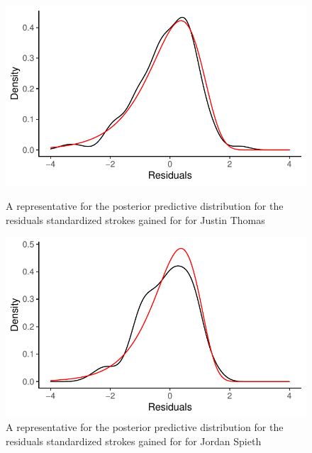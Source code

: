 \documentclass{article}\usepackage[]{graphicx}\usepackage[]{color}
\begin{document}
\begin{figure}[h]
\begin{minipage}{0.475\textwidth}
    \centering
    \includegraphics[width=1\textwidth]{Figures/posterior_predictive_thomas.pdf}
    \caption{A representative for the posterior predictive distribution for the residuals standardized strokes gained for for Justin Thomas}
    \label{fig:thomas_posterior_predictive}
\end{minipage}
\hspace{0.05\textwidth}
\begin{minipage}{0.475\textwidth}
    \centering
    \includegraphics[width=1\textwidth]{Figures/posterior_predictive_spieth.pdf}
    \caption{A representative for the posterior predictive distribution for the residuals standardized strokes gained for for Jordan Spieth}
    \label{fig:spieth_posterior_predictive}
\end{minipage}
\end{figure}
%
\end{document}
